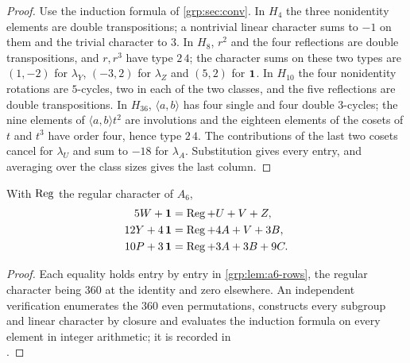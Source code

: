 \begin{proof}
Use the induction formula of \cref{grp:sec:conv}. In $H_4$ the three
nonidentity elements are double transpositions; a nontrivial linear character
sums to $-1$ on them and the trivial character to $3$. In $H_8$, $r^2$ and the
four reflections are double transpositions, and $r,r^3$ have type $2\,4$; the
character sums on these two types are $(1,-2)$ for $\lambda_Y$, $(-3,2)$ for
$\lambda_Z$ and $(5,2)$ for $\mathbf{1}$. In $H_{10}$ the four nonidentity
rotations are $5$-cycles, two in each of the two classes, and the five
reflections are double transpositions. In $H_{36}$, $\langle a,b\rangle$ has
four single and four double $3$-cycles; the nine elements of
$\langle a,b\rangle t^2$ are involutions and the eighteen elements of the
cosets of $t$ and $t^3$ have order four, hence type $2\,4$. The contributions
of the last two cosets cancel for $\lambda_U$ and sum to $-18$ for
$\lambda_A$. Substitution gives every entry, and averaging over the class
sizes gives the last column.
\end{proof}

\begin{theorem}\label{grp:thm:a6-identities}
With $\operatorname{Reg}$ the regular character of $A_6$,
\begin{align}
 5W+\mathbf{1}&=\operatorname{Reg}+U+V+Z,\label{grp:eq:a6-W}\\
 12Y+4\,\mathbf{1}&=\operatorname{Reg}+4A+V+3B,\label{grp:eq:a6-Y}\\
 10P+3\,\mathbf{1}&=\operatorname{Reg}+3A+3B+9C.\label{grp:eq:a6-P}
\end{align}
\end{theorem}

\begin{proof}
Each equality holds entry by entry in \cref{grp:lem:a6-rows}, the regular
character being $360$ at the identity and zero elsewhere. An independent
verification enumerates the $360$ even permutations, constructs every
subgroup and linear character by closure and evaluates the induction formula
on every element in integer arithmetic; it is recorded in\\
.
\end{proof}

